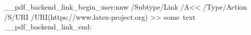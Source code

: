 \documentclass{article}
\begin{document}
\ExplSyntaxOn
\__pdf_backend_link_begin_user:nnw {}
      {
        /Subtype/Link
        /A<<
         /Type/Action
         /S/URI
         /URI(https://www.latex-project.org)
       >>
      }
some~text
\__pdf_backend_link_end:
\ExplSyntaxOff
\end{document}
